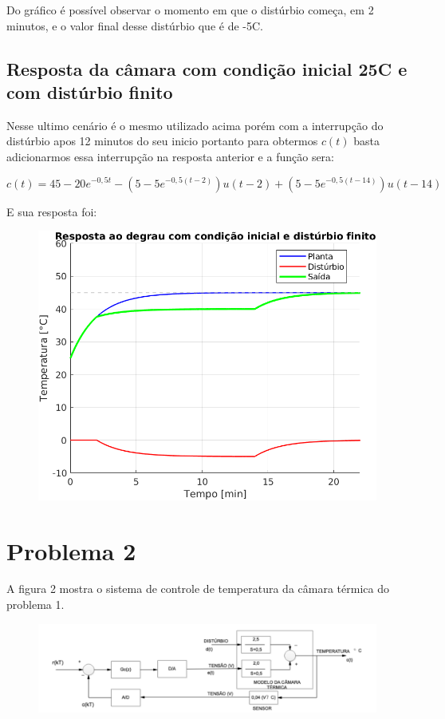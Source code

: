 \documentclass[a4paper,12pt]{article}
\begin{document}
		Do gráfico é possível observar o momento em que o distúrbio começa, em 2 minutos, e o valor final desse distúrbio que é de -5\degree C.
		
	\subsection{Resposta da câmara com condição inicial 25\degree C e com distúrbio finito}
		Nesse ultimo cenário é o mesmo utilizado acima porém com a interrupção do distúrbio apos 12 minutos do seu inicio portanto para obtermos $c(t)$ basta adicionarmos essa interrupção na resposta anterior e a função sera:
		
		\begin{equation}
			c(t) = 45 - 20e^{-0,5t} - (5 - 5e^{-0,5(t-2)})u(t-2) + (5 - 5e^{-0,5(t-14)})u(t-14)
		\end{equation}
	
		E sua resposta foi:
		
		\begin{figure}[H]
			\centering
			\includegraphics[width=0.5\linewidth]{images/respe.png}
			\label{fig:resposta_e}
		\end{figure}
	
	\section{Problema 2}
		A figura 2 mostra o sistema de controle de temperatura da câmara térmica do problema 1.
		
		\begin{figure}[H]
			\centering
			\includegraphics[width=0.9\linewidth]{images/planta_problema2}
			\label{fig:plantaproblema2}
		\end{figure}
	
\end{document}
